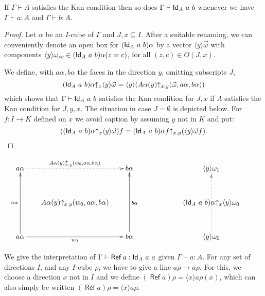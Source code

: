 \documentclass[10pt,a4paper]{article}
\DeclareMathOperator{\Ref}{\mathsf{Ref}}
\newcommand{\Id}{{\sf Id}}
\newcommand{\es}{\emptyset}
\newcommand{\rupx}[1]{#1{\uparrow_{x}}}
\newcommand{\rupxy}[1]{#1{\uparrow_{x,y}}}
\newcommand{\bind}[2]{{\langle}#1{\rangle}#2}
\begin{document}
\begin{theorem}
If $\Gamma\vdash A$  satisfies the Kan condition then so does $\Gamma\vdash\Id_A~a~b$ whenever we have
$\Gamma\vdash a:A$ and $\Gamma\vdash b:A$.
\end{theorem}

\begin{proof}
  Let $\alpha$ be an $I$-cube of $\Gamma$ and $J,x\subseteq I$. After
  a suitable renaming, we can conveniently denote an open box for
  $(\Id_A~a~b)\alpha$ by a vector $\bind{y}{\vec{\omega}}$ with
  components $\bind{y}{\omega_{zc}}\in(\Id_A~a~b)\alpha(z=c)$, for all
  $(z,c)\in O(J,x)$.

  We define, with $a\alpha,b\alpha$ the faces in the direction $y$,
  omitting subscripts $J$,
  $$
  \rupx{(\Id_A~a~b)\alpha}\bind{y}{\vec{\omega}} =
  \bind{y}{(\rupxy{A\alpha(y)} (\vec{\omega},a\alpha,b\alpha))}
  $$
  which shows that $\Gamma\vdash \Id_A~a~b$ satisfies the Kan
  condition for $J,x$ if $A$ satisfies the Kan condition for
  $J,y,x$. The situation in case $J=\es$ is depicted below. For
  $f:I\to K$ defined on $x$ we avoid caption by assuming $y$ not in
  $K$ and put:
  $$
  (\rupx{(\Id_A~a~b)\alpha} \bind{y}{\vec{\omega}})f =
  \rupxy{(\Id_A~a~b)\alpha f} (\bind{y}{\vec{\omega}f}).
  $$
\end{proof}
\[
\xymatrix@R=1.1cm@C=.6cm{
a\alpha\ar@{.>}[rr]^{A\alpha(y)_{x,y}^+(w_0,a\alpha,b\alpha)}&      & b\alpha                                     &&&
\bind{y}{\omega_1}                                &          \\
                                      &\rupxy{A\alpha(y)}(w_0,a\alpha,b\alpha)&                          &&&
                                      \rupx{(\Id_A~a~b)\alpha} \bind{y}{\omega_0}&                           \\
a\alpha\ar[rr]_{w_0}\ar[uu]^{a\alpha}&      & b\alpha\ar[uu]_{b\alpha}                                     &&&
\bind{y}{\omega_0}\ar@{.>}[uu]     &                             \\
}
\]

We give the interpretation of $\Gamma\vdash \Ref a:\Id_A~a~a$ given
$\Gamma\vdash a:A$. For any set of directions $I$, and any $I$-cube
$\rho$, we have to give a line $a\rho\to a\rho$. For this, we choose a
direction $x$ not in $I$ and we define $(\Ref a)\rho = \bind{x}{a\rho
  (x)}$, which can also simply be written $(\Ref a)\rho =
\bind{x}{a\rho}$.
\end{document}

